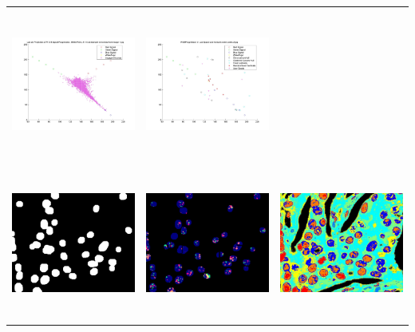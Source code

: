 \begin{tabular}{ |c|c|c| }
\includegraphics[width=5.0cm,height=5.0cm]{images/Her2Fish/1_SampleChromas.jpg}  &
\includegraphics[width=5.0cm,height=5.0cm]{images/Her2Fish/2_abConvexHull.jpg}   \\
\includegraphics[width=5.0cm,height=5.0cm]{images/Her2Fish/2_Processedlabelimage.jpg}  &
\includegraphics[width=5.0cm,height=5.0cm]{images/Her2Fish/2_RGBMASK.jpg}           &
\includegraphics[width=5.0cm,height=5.0cm]{images/Her2Fish/2_RGB_LabelImg.jpg}   \\

\end{tabular}
